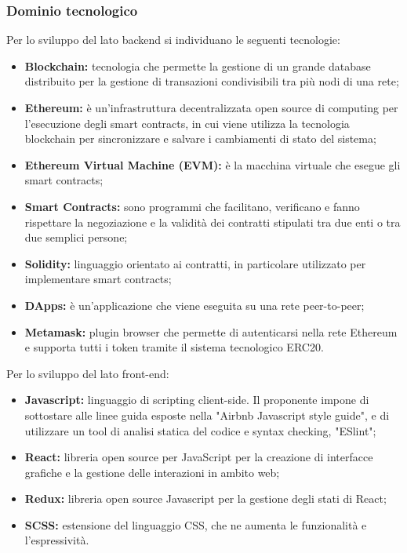 \subsubsection{Dominio tecnologico}
Per lo sviluppo del lato backend si individuano le seguenti tecnologie:
\begin{itemize}
    \item \textbf{Blockchain:} tecnologia che permette la gestione di un grande 
database distribuito per la gestione di transazioni condivisibili tra più nodi 
di una rete;
	\item \textbf{Ethereum:} è un'infrastruttura decentralizzata open source di 
computing per l'esecuzione degli smart contracts, in cui viene utilizza la 
tecnologia blockchain per sincronizzare e salvare i cambiamenti di stato del 
sistema;
	\item \textbf{Ethereum Virtual Machine (EVM): }è la macchina virtuale che 
esegue gli smart contracts;
	\item \textbf{Smart Contracts:} sono programmi che facilitano, verificano e 
fanno rispettare la negoziazione e la validità dei contratti stipulati tra due 
enti o tra due semplici persone;
	\item \textbf{Solidity:} linguaggio orientato ai contratti, in particolare 
utilizzato per 
implementare smart contracts;
	\item \textbf{DApps:} è un'applicazione che viene eseguita su una rete 
peer-to-peer;
	\item \textbf{Metamask:} plugin browser che permette di autenticarsi nella rete 
Ethereum e supporta tutti i token tramite il sistema tecnologico ERC20.

\end{itemize}
Per lo sviluppo del lato front-end:
\begin{itemize}
	\item \textbf{Javascript:} linguaggio di scripting client-side. Il proponente 
impone di sottostare alle linee guida esposte nella "Airbnb Javascript style 
guide", e di utilizzare un tool di analisi statica del codice e syntax checking, 
"ESlint";
	\item \textbf{React:}  libreria open source per JavaScript per la creazione di 
interfacce grafiche e la gestione delle interazioni in ambito web;
	\item \textbf {Redux:} libreria open source Javascript per la gestione degli 
stati di React;
	
	\item \textbf{SCSS:} estensione del linguaggio CSS, che ne aumenta le 
funzionalità e l'espressività.
\end{itemize}


